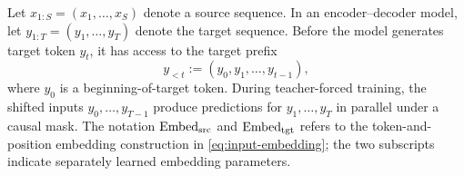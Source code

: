 \documentclass[11pt,twoside]{article}
\theoremstyle{plain}
\theoremstyle{definition}
\theoremstyle{remark}
\begin{document}
Let $x_{1:S}=(x_1,\ldots,x_S)$ denote a source sequence. In an
encoder--decoder model, let $y_{1:T}=(y_1,\ldots,y_T)$ denote the target
sequence. Before the model generates target token $y_t$, it has access to the
target prefix
\begin{equation}
y_{<t}:=(y_0,y_1,\ldots,y_{t-1}),
\label{eq:target-prefix}
\end{equation}
where $y_0$ is a beginning-of-target token. During teacher-forced training, the
shifted inputs $y_0,\ldots,y_{T-1}$ produce predictions for
$y_1,\ldots,y_T$ in parallel under a causal mask. The notation
$\operatorname{Embed}_{\rm src}$ and $\operatorname{Embed}_{\rm tgt}$ refers
to the token-and-position embedding construction in
\eqref{eq:input-embedding}; the two subscripts indicate separately learned
embedding parameters.
\end{document}
